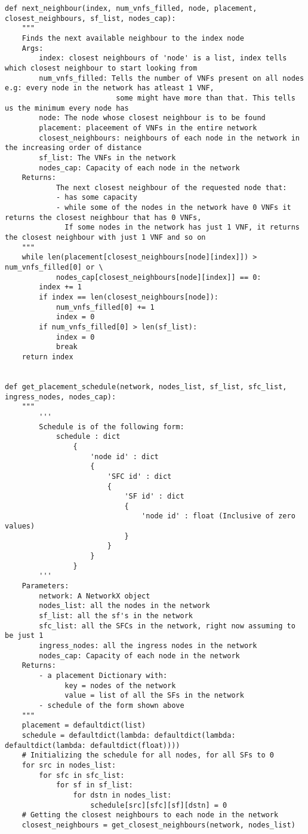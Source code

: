 \begin{lstlisting}
def next_neighbour(index, num_vnfs_filled, node, placement, closest_neighbours, sf_list, nodes_cap):
    """
    Finds the next available neighbour to the index node
    Args:
        index: closest neighbours of 'node' is a list, index tells which closest neighbour to start looking from
        num_vnfs_filled: Tells the number of VNFs present on all nodes e.g: every node in the network has atleast 1 VNF,
                          some might have more than that. This tells us the minimum every node has
        node: The node whose closest neighbour is to be found
        placement: placeement of VNFs in the entire network
        closest_neighbours: neighbours of each node in the network in the increasing order of distance
        sf_list: The VNFs in the network
        nodes_cap: Capacity of each node in the network
    Returns:
            The next closest neighbour of the requested node that:
            - has some capacity
            - while some of the nodes in the network have 0 VNFs it returns the closest neighbour that has 0 VNFs,
              If some nodes in the network has just 1 VNF, it returns the closest neighbour with just 1 VNF and so on
    """
    while len(placement[closest_neighbours[node][index]]) > num_vnfs_filled[0] or \
            nodes_cap[closest_neighbours[node][index]] == 0:
        index += 1
        if index == len(closest_neighbours[node]):
            num_vnfs_filled[0] += 1
            index = 0
        if num_vnfs_filled[0] > len(sf_list):
            index = 0
            break
    return index


def get_placement_schedule(network, nodes_list, sf_list, sfc_list, ingress_nodes, nodes_cap):
    """
        '''
        Schedule is of the following form:
            schedule : dict
                {
                    'node id' : dict
                    {
                        'SFC id' : dict
                        {
                            'SF id' : dict
                            {
                                'node id' : float (Inclusive of zero values)
                            }
                        }
                    }
                }
        '''
    Parameters:
        network: A NetworkX object
        nodes_list: all the nodes in the network
        sf_list: all the sf's in the network
        sfc_list: all the SFCs in the network, right now assuming to be just 1
        ingress_nodes: all the ingress nodes in the network
        nodes_cap: Capacity of each node in the network
    Returns:
        - a placement Dictionary with:
              key = nodes of the network
              value = list of all the SFs in the network
        - schedule of the form shown above
    """
    placement = defaultdict(list)
    schedule = defaultdict(lambda: defaultdict(lambda: defaultdict(lambda: defaultdict(float))))
    # Initializing the schedule for all nodes, for all SFs to 0
    for src in nodes_list:
        for sfc in sfc_list:
            for sf in sf_list:
                for dstn in nodes_list:
                    schedule[src][sfc][sf][dstn] = 0
    # Getting the closest neighbours to each node in the network
    closest_neighbours = get_closest_neighbours(network, nodes_list)


\end{lstlisting}
